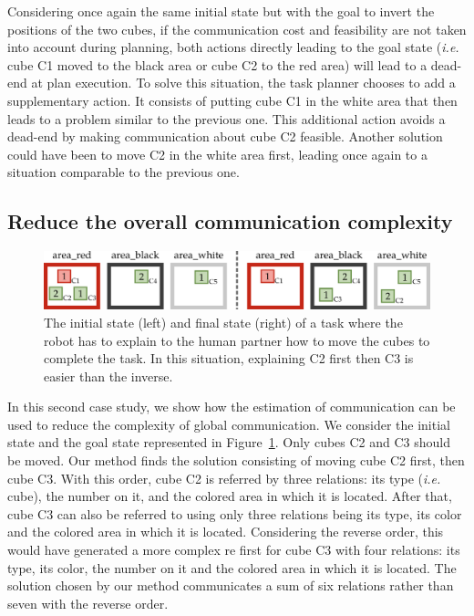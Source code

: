 Considering once again the same initial state but with the goal to invert the positions of the two cubes, if the communication cost and feasibility are not taken into account during planning, both actions directly leading to the goal state (\textit{i.e.} cube C1 moved to the black area or cube C2 to the red area) will lead to a dead-end at plan execution. To solve this situation, the task planner chooses to add a supplementary action. It consists of putting cube C1 in the white area that then leads to a problem similar to the previous one. This additional action avoids a dead-end by making communication about cube C2 feasible. Another solution could have been to move C2 in the white area first, leading once again to a situation comparable to the previous one.

\subsection{Reduce the overall communication complexity}

\begin{figure}[!ht]
\centering
\includegraphics[width=\textwidth]{figures/chapter5/results_case2.png}
\caption{\label{fig:chap5_case2} The initial state (left) and final state (right) of a task where the robot has to explain to the human partner how to move the cubes to complete the task. In this situation, explaining C2 first then C3 is easier than the inverse. }
\end{figure}

In this second case study, we show how the estimation of communication can be used to reduce the complexity of global communication. We consider the initial state and the goal state represented in Figure~\ref{fig:chap5_case2}. Only cubes C2 and C3 should be moved. Our method finds the solution consisting of moving cube C2 first, then cube C3. With this order, cube C2 is referred by three relations: its type (\textit{i.e.} cube), the number on it, and the colored area in which it is located. After that, cube C3 can also be referred to using only three relations being its type, its color and the colored area in which it is located. Considering the reverse order, this would have generated a more complex \acrshort{re} first for cube C3 with four relations: its type, its color, the number on it and the colored area in which it is located.
The solution chosen by our method communicates a sum of six relations rather than seven with the reverse order.


